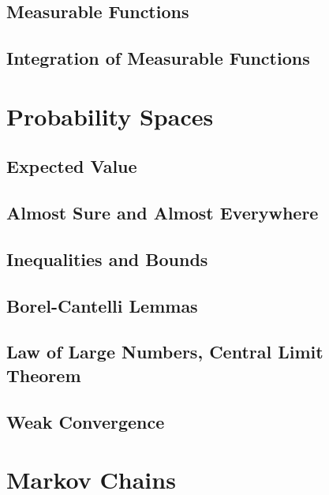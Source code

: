 \documentclass[english, course]{Notes}
\begin{document}
\subsection{Measurable Functions}

\subsection{Integration of Measurable Functions}

\section{Probability Spaces}

\subsection{Expected Value}

\subsection{Almost Sure and Almost Everywhere}

\subsection{Inequalities and Bounds}

\subsection{Borel-Cantelli Lemmas}

\subsection{Law of Large Numbers, Central Limit Theorem}

\subsection{Weak Convergence}

\section{Markov Chains}
\end{document}

